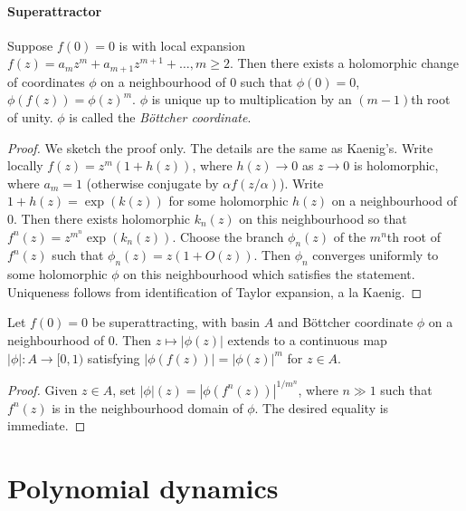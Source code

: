 \documentclass[a4paper]{article}
\begin{document}
\paragraph{Superattractor}

\begin{theorem}
  Suppose \(f(0) = 0\) is with local expansion \(f(z) = a_mz^m + a_{m + 1}z^{m + 1} + \dots, m \geq 2\). Then there exists a holomorphic change of coordinates \(\phi\) on a neighbourhood of \(0\) such that \(\phi(0) = 0\), \(\phi(f(z)) = \phi(z)^m\). \(\phi\) is unique up to multiplication by an \((m - 1)\)th root of unity. \(\phi\) is called the \emph{Böttcher coordinate}.
\end{theorem}

\begin{proof}
  We sketch the proof only. The details are the same as Kaenig's. Write locally \(f(z) = z^m(1 + h(z))\), where \(h(z) \to 0\) as \(z \to 0\) is holomorphic, where \(a_m = 1\) (otherwise conjugate by \(\alpha f(z/\alpha)\)). Write \(1 + h(z) = \exp(k(z))\) for some holomorphic \(h(z)\) on a neighbourhood of \(0\). Then there exists holomorphic \(k_n(z)\) on this neighbourhood so that \(f^n(z) = z^{m^n} \exp(k_n(z))\). Choose the branch \(\phi_n(z)\) of the \(m^n\)th root of \(f^n(z)\) such that \(\phi_n(z) = z(1 + O(z))\). Then \(\phi_n\) converges uniformly to some holomorphic \(\phi\) on this neighbourhood which satisfies the statement. Uniqueness follows from identification of Taylor expansion, a la Kaenig.
\end{proof}

\begin{corollary}
  Let \(f(0) = 0\) be superattracting, with basin \(A\) and Böttcher coordinate \(\phi\) on a neighbourhood of \(0\). Then \(z \mapsto |\phi(z)|\) extends to a continuous map \(|\phi|: A \to [0, 1)\) satisfying \(|\phi(f(z))| = |\phi(z)|^m\) for \(z \in A\).
\end{corollary}

\begin{proof}
  Given \(z \in A\), set \(|\phi|(z) = |\phi(f^n(z))|^{1/m^n}\), where \(n \gg 1\) such that \(f^n(z)\) is in the neighbourhood domain of \(\phi\). The desired equality is immediate.
\end{proof}

\section{Polynomial dynamics}
\end{document}
